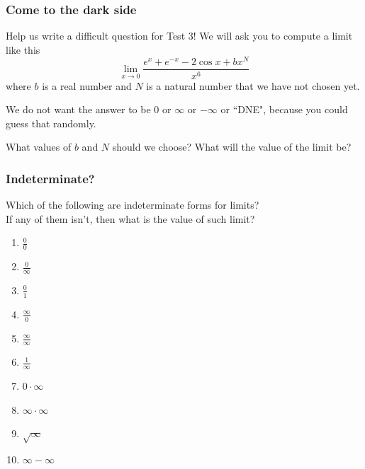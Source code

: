 \begin{frame}[t]
	\fontsize{13}{13}\selectfont
	\frametitle{Come to the dark side}

	Help us write a difficult question for Test 3! We will ask you to compute a
	limit like this
	\[
		\lim_{x \to 0}\frac{e^{x}+ e^{-x}- 2 \cos x + bx^{N}}{x^{6}}
	\]
	where $b$ is a real number and $N$ is a natural number that we have not chosen
	yet.

	We do not want the answer to be $0$ or $\infty$ or $-\infty$ or ``DNE",
	because you could guess that randomly.

	What values of $b$ and $N$ should we choose? What will the value of the limit be?
\end{frame}

\begin{frame}[t]
	\frametitle{Indeterminate?}

	Which of the following are indeterminate forms for limits? \\ If any of them isn't,
	then what is the value of such limit?

	\begin{multicols}{4}
		\begin{enumerate}
			\setlength{\itemsep}{1em}

			\item $\displaystyle \frac{0}{0}$

			\item $\displaystyle \frac{0}{\infty}$

			\item $\displaystyle \frac{0}{1}$

			\item $\displaystyle \frac{\infty}{0}$

			\item $\displaystyle \frac{\infty}{\infty}$

			\item $\displaystyle \frac{1}{\infty}$

			\item $\displaystyle 0 \cdot \infty$ 

			\item $\displaystyle \infty \cdot \infty$ 

			\item $\displaystyle \sqrt{\infty}$

			\item $\displaystyle \infty - \infty$


\end{enumerate}
\end{multicols}
\end{frame}
